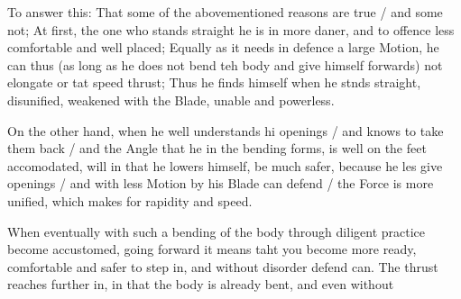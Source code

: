 To answer this: That some of the abovementioned reasons are true / and
some not; At first, the one who stands straight he is in more daner,
and to offence less comfortable and well placed; Equally as it needs
in defence a large Motion, he can thus (as long as he does not
bend teh body and give himself forwards) not elongate or tat speed
thrust; Thus he finds himself when he stnds straight, disunified,
weakened with the Blade, unable and powerless.


On the other hand, when he well understands hi openings / and knows to
take them back / and the Angle that he in the bending forms, is well
on the feet accomodated, will in that he lowers himself, be much safer, because he les give
openings / and with less Motion by his Blade can defend / the Force is
more unified, which makes for rapidity and speed.


When eventually with such a bending of the body through diligent
practice become accustomed, going forward it means taht you become
more ready, comfortable and safer to step in, and without disorder
defend can. The thrust reaches further in, in that the body is already
bent, and even without